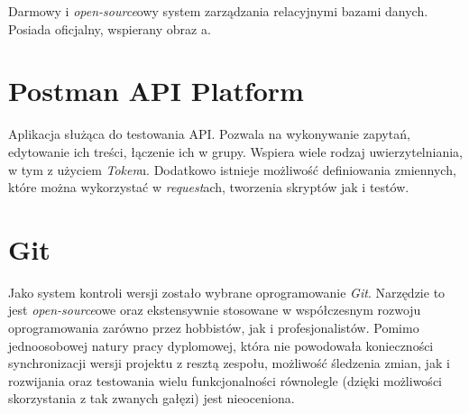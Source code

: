 \par Darmowy i \emph{open-source}owy system zarządzania relacyjnymi bazami danych. Posiada oficjalny, wspierany obraz \emph{\docker}a.

\section{Postman API Platform}

\par Aplikacja służąca do testowania API. Pozwala na wykonywanie zapytań, edytowanie ich treści, łączenie ich w grupy. Wspiera wiele rodzaj uwierzytelniania, w tym z użyciem \emph{Token}u. Dodatkowo istnieje możliwość definiowania zmiennych, które można wykorzystać w \emph{request}ach, tworzenia skryptów jak i testów.\cite{POSTMAN_DOCUMENTATION}

\section{Git}

\par Jako system kontroli wersji zostało wybrane oprogramowanie \emph{Git}. Narzędzie to jest \emph{open-source}owe oraz ekstensywnie stosowane w współczesnym rozwoju oprogramowania zarówno przez hobbistów, jak i profesjonalistów. Pomimo jednoosobowej natury pracy dyplomowej, która nie powodowała konieczności synchronizacji wersji projektu z resztą zespołu, możliwość śledzenia zmian, jak i rozwijania oraz testowania wielu funkcjonalności równolegle (dzięki możliwości skorzystania z tak zwanych gałęzi) jest nieoceniona.